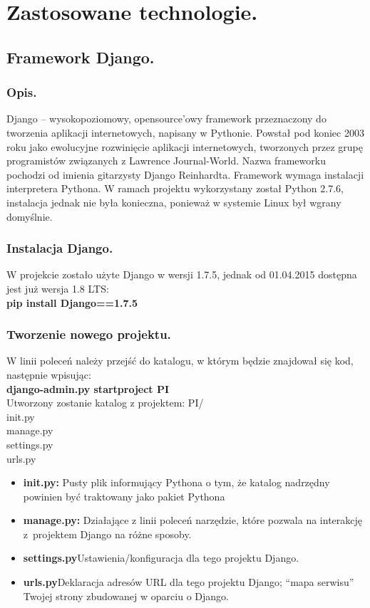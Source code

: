 \documentclass[a4paper,12pt]{article}		%
\begin{document}
\section{Zastosowane technologie.}

\subsection{Framework Django.}

\subsubsection{Opis.}
Django – wysokopoziomowy, opensource’owy framework przeznaczony do tworzenia aplikacji internetowych, napisany w Pythonie. Powstał pod koniec 2003 roku jako ewolucyjne rozwinięcie aplikacji internetowych, tworzonych przez grupę programistów związanych z Lawrence Journal-World. Nazwa frameworku pochodzi od imienia gitarzysty Django Reinhardta.
Framework wymaga instalacji interpretera Pythona. W ramach projektu wykorzystany został Python 2.7.6, instalacja jednak nie była konieczna, ponieważ w systemie Linux był wgrany domyślnie.

\subsubsection{Instalacja Django.}
W projekcie zostało użyte Django w wersji 1.7.5, jednak od 01.04.2015 dostępna jest już wersja 1.8 LTS:\\
\textbf{pip install Django==1.7.5}

\subsubsection{Tworzenie nowego projektu.}
W linii poleceń należy przejść do katalogu, w którym będzie znajdował się kod, następnie wpisując:\\
\textbf{django-admin.py startproject PI}\\
Utworzony zostanie katalog z projektem:
PI/\\
init.py\\
manage.py\\
settings.py\\
urls.py

\begin{itemize}
\item \textbf{init.py: }Pusty plik informujący Pythona o tym, że katalog nadrzędny powinien być traktowany jako pakiet Pythona 
\item \textbf{manage.py: }Działające z linii poleceń narzędzie, które pozwala na interakcję z~projektem Django na różne sposoby.
\item \textbf{settings.py}Ustawienia/konfiguracja dla tego projektu Django.
\item \textbf{urls.py}Deklaracja adresów URL dla tego projektu Django; “mapa serwisu” Twojej strony zbudowanej w oparciu o Django.
\end{itemize}
\end{document}
